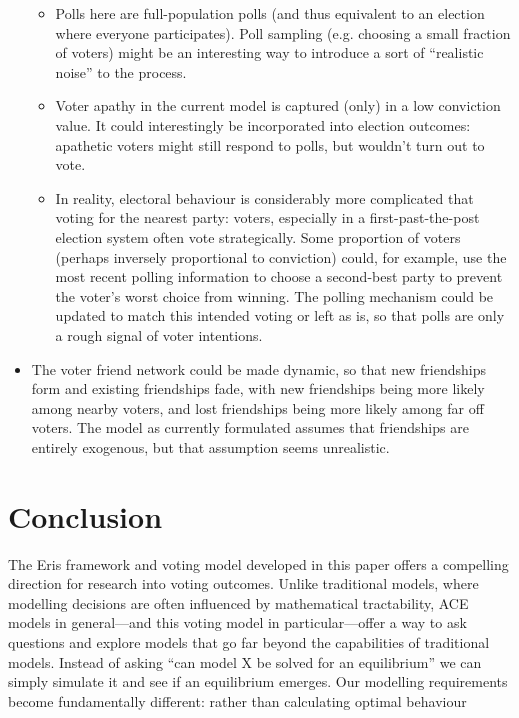 \documentclass[12pt]{article}
\numberwithin{equation}{subsection}
\begin{document}
\begin{itemize}
\begin{itemize}
            \item
                Polls here are full-population polls (and thus equivalent to an election where everyone
                participates).  Poll sampling (e.g. choosing a small fraction of voters) might be an
                interesting way to introduce a sort of ``realistic noise'' to the process.
            \item
                Voter apathy in the current model is captured (only) in a low conviction value.  It could
                interestingly be incorporated into election outcomes: apathetic voters might still respond
                to polls, but wouldn't turn out to vote.
            \item
                In reality, electoral behaviour is considerably more complicated that voting for the
                nearest party: voters, especially in a first-past-the-post election system often
                vote strategically.  Some proportion of voters (perhaps inversely proportional to
                conviction) could, for example, use the most recent polling information to choose a
                second-best party to prevent the voter's worst choice from winning.  The polling
                mechanism could be updated to match this intended voting or left as is, so that
                polls are only a rough signal of voter intentions.
        \end{itemize}

    \item
        The voter friend network could be made dynamic, so that new friendships form and existing
        friendships fade, with new friendships being more likely among nearby voters, and lost
        friendships being more likely among far off voters.  The model as currently formulated
        assumes that friendships are entirely exogenous, but that assumption seems unrealistic.

\end{itemize}

\section{Conclusion}\label{s:conc}

The Eris framework and voting model developed in this paper offers a compelling direction for
research into voting outcomes.  Unlike traditional models, where modelling decisions are often
influenced by mathematical tractability, ACE models in general---and this voting model in
particular---offer a way to ask questions and explore models that go far beyond the capabilities of
traditional models.  Instead of asking ``can model X be solved for an equilibrium'' we can simply
simulate it and see if an equilibrium emerges.  Our modelling requirements become fundamentally
different: rather than calculating optimal behaviour
\end{document}
